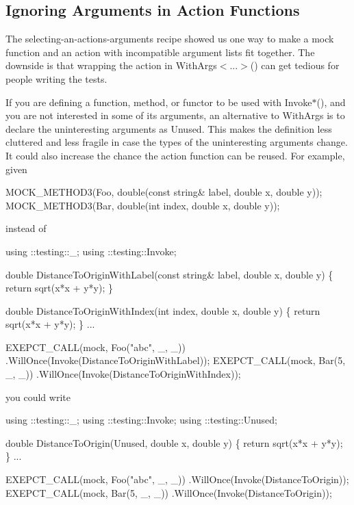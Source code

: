\subsection*{Ignoring Arguments in Action Functions}

The selecting-\/an-\/action\textquotesingle{}s-\/arguments recipe showed us one way to make a mock function and an action with incompatible argument lists fit together. The downside is that wrapping the action in {\ttfamily With\+Args$<$...$>$()} can get tedious for people writing the tests.

If you are defining a function, method, or functor to be used with {\ttfamily Invoke$\ast$()}, and you are not interested in some of its arguments, an alternative to {\ttfamily With\+Args} is to declare the uninteresting arguments as {\ttfamily Unused}. This makes the definition less cluttered and less fragile in case the types of the uninteresting arguments change. It could also increase the chance the action function can be reused. For example, given


\begin{DoxyCode}
MOCK\_METHOD3(Foo, double(const string& label, double x, double y));
MOCK\_METHOD3(Bar, double(int index, double x, double y));
\end{DoxyCode}


instead of


\begin{DoxyCode}
using ::testing::\_;
using ::testing::Invoke;

double DistanceToOriginWithLabel(const string& label, double x, double y) \{
  return sqrt(x*x + y*y);
\}

double DistanceToOriginWithIndex(int index, double x, double y) \{
  return sqrt(x*x + y*y);
\}
...

  EXEPCT\_CALL(mock, Foo("abc", \_, \_))
      .WillOnce(Invoke(DistanceToOriginWithLabel));
  EXEPCT\_CALL(mock, Bar(5, \_, \_))
      .WillOnce(Invoke(DistanceToOriginWithIndex));
\end{DoxyCode}


you could write


\begin{DoxyCode}
using ::testing::\_;
using ::testing::Invoke;
using ::testing::Unused;

double DistanceToOrigin(Unused, double x, double y) \{
  return sqrt(x*x + y*y);
\}
...

  EXEPCT\_CALL(mock, Foo("abc", \_, \_))
      .WillOnce(Invoke(DistanceToOrigin));
  EXEPCT\_CALL(mock, Bar(5, \_, \_))
      .WillOnce(Invoke(DistanceToOrigin));
\end{DoxyCode}


